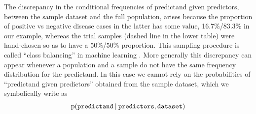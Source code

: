 \documentclass[a4paper,12pt,%
onecolumn,oneside,article,%
british%
]{memoir}
\theoremstyle{remark}
\theoremstyle{innote}
\newcommand*{\wrench}{{\fontencoding{U}\fontfamily{fontawesomethree}\selectfont\symbol{114}}}
\newcommand{\mynotew}[1]{{\footnotesize\color{notecolour}\wrench\ #1}}
\newcommand*{\p}{\mathrm{p}}%
\renewcommand*{\|}[1][]{\nonscript\:#1\vert\nonscript\:\mathopen{}}
\newcommand*{\predictors}{\texttt{predictors}}
\newcommand*{\predictand}{\texttt{predictand}}
\newcommand*{\dataset}{\texttt{dataset}}
\begin{document}
The discrepancy in the conditional frequencies of predictand given predictors, between the sample dataset and the full population, arises because the proportion of positive vs negative disease cases in the latter has some value, 16.7\%/83.3\% in our example, whereas the trial samples (dashed line in the lower table) were hand-chosen so as to have a 50\%/50\% proportion. This sampling procedure is called \enquote{class balancing} in machine learning \autocites{provost2000,drummondetal2005,weissetal2003}. More generally this discrepancy can appear whenever a population and a sample do not have the same frequency distribution for the predictand. In this case we cannot rely on the probabilities of \enquote{predictand given predictors} obtained from the sample dataset, which we symbolically write as
\begin{equation}
  \p(\predictand \| \predictors, \dataset)
\end{equation}

\end{document}
